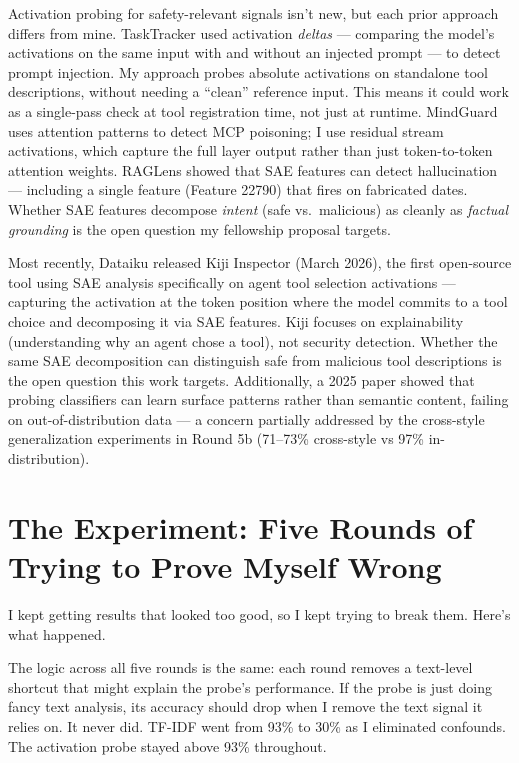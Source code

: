 \documentclass[11pt]{article}
\begin{document}
Activation probing for safety-relevant signals isn't new, but each prior approach differs from mine. TaskTracker \citep{abdelnabi2024drift} used activation \emph{deltas} --- comparing the model's activations on the same input with and without an injected prompt --- to detect prompt injection. My approach probes absolute activations on standalone tool descriptions, without needing a ``clean'' reference input. This means it could work as a single-pass check at tool registration time, not just at runtime. MindGuard \citep{wang2025mindguard} uses attention patterns to detect MCP poisoning; I use residual stream activations, which capture the full layer output rather than just token-to-token attention weights. RAGLens \citep{xiong2026raglens} showed that SAE features can detect hallucination --- including a single feature (Feature 22790) that fires on fabricated dates. Whether SAE features decompose \emph{intent} (safe vs.\ malicious) as cleanly as \emph{factual grounding} is the open question my fellowship proposal targets.

Most recently, Dataiku released Kiji Inspector \citep{hapke2026kiji} (March 2026), the first open-source tool using SAE analysis specifically on agent tool selection activations --- capturing the activation at the token position where the model commits to a tool choice and decomposing it via SAE features. Kiji focuses on explainability (understanding why an agent chose a tool), not security detection. Whether the same SAE decomposition can distinguish safe from malicious tool descriptions is the open question this work targets. Additionally, a 2025 paper \citep{falsesense2025} showed that probing classifiers can learn surface patterns rather than semantic content, failing on out-of-distribution data --- a concern partially addressed by the cross-style generalization experiments in Round 5b (71--73\% cross-style vs 97\% in-distribution).

\section{The Experiment: Five Rounds of Trying to Prove Myself Wrong}

I kept getting results that looked too good, so I kept trying to break them. Here's what happened.

The logic across all five rounds is the same: each round removes a text-level shortcut that might explain the probe's performance. If the probe is just doing fancy text analysis, its accuracy should drop when I remove the text signal it relies on. It never did. TF-IDF went from 93\% to 30\% as I eliminated confounds. The activation probe stayed above 93\% throughout.
\end{document}
